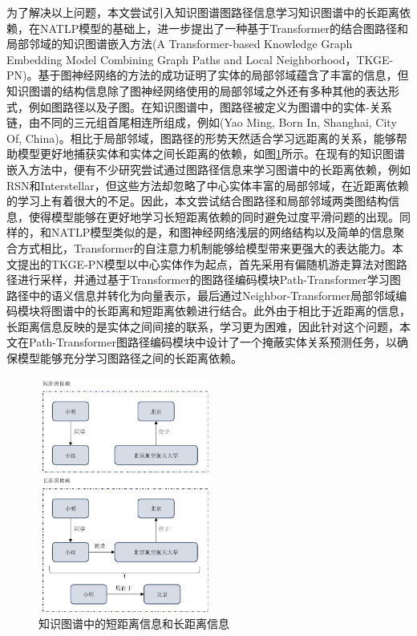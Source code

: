 为了解决以上问题，本文尝试引入知识图谱图路径信息学习知识图谱中的长距离依赖，在NATLP模型的基础上，进一步提出了一种基于Transformer的结合图路径和局部邻域的知识图谱嵌入方法(A Transformer-based Knowledge Graph Embedding Model Combining Graph Paths and Local Neighborhood，TKGE-PN)。基于图神经网络的方法的成功证明了实体的局部邻域蕴含了丰富的信息，但知识图谱的结构信息除了图神经网络使用的局部邻域之外还有多种其他的表达形式，例如图路径以及子图。在知识图谱中，图路径被定义为图谱中的实体-关系链，由不同的三元组首尾相连所组成，例如(Yao Ming, Born In, Shanghai, City Of, China)。相比于局部邻域，图路径的形势天然适合学习远距离的关系，能够帮助模型更好地捕获实体和实体之间长距离的依赖，如图\ref{long-term-dependency}所示。在现有的知识图谱嵌入方法中，便有不少研究尝试通过图路径信息来学习图谱中的长距离依赖，例如RSN\cite{RSN}和Interstellar\cite{Interstellar}，但这些方法却忽略了中心实体丰富的局部邻域，在近距离依赖的学习上有着很大的不足。因此，本文尝试结合图路径和局部邻域两类图结构信息，使得模型能够在更好地学习长短距离依赖的同时避免过度平滑问题的出现。同样的，和NATLP模型类似的是，和图神经网络浅层的网络结构以及简单的信息聚合方式相比，Transformer的自注意力机制能够给模型带来更强大的表达能力。本文提出的TKGE-PN模型以中心实体作为起点，首先采用有偏随机游走算法对图路径进行采样，并通过基于Transformer的图路径编码模块Path-Transformer学习图路径中的语义信息并转化为向量表示，最后通过Neighbor-Transformer局部邻域编码模块将图谱中的长距离和短距离依赖进行结合。此外由于相比于近距离的信息，长距离信息反映的是实体之间间接的联系，学习更为困难，因此针对这个问题，本文在Path-Transformer图路径编码模块中设计了一个掩蔽实体关系预测任务，以确保模型能够充分学习图路径之间的长距离依赖。

\begin{figure}[htb]
    \centerline{\includegraphics[width=0.5\textwidth]{pic/long-term-dependency.pdf}}
    \caption{知识图谱中的短距离信息和长距离信息}
    \label{long-term-dependency}
  \end{figure}

